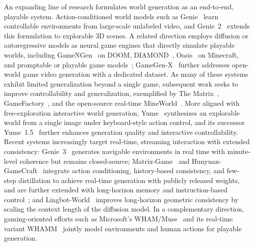 An expanding line of research formulates world generation as an end-to-end, playable system.
Action-conditioned world models such as Genie~\cite{bruce2024genie} learn controllable environments from large-scale unlabeled video, and Genie~2~\cite{parker2024genie} extends this formulation to explorable 3D scenes.
A related direction employs diffusion or autoregressive models as neural game engines that directly simulate playable worlds, including GameNGen~\cite{valevski2025diffusion} on DOOM, DIAMOND~\cite{alonso2024diffusion}, Oasis~\cite{decart2024oasis} on Minecraft, and promptable or playable game models~\cite{menapace2024promptable,yang2024playable}; GameGen-X~\cite{che2025gamegen} further addresses open-world game video generation with a dedicated dataset.
As many of these systems exhibit limited generalization beyond a single game, subsequent work seeks to improve controllability and generalization, exemplified by The Matrix~\cite{feng2026matrix}, GameFactory~\cite{yu2025gamefactory}, and the open-source real-time MineWorld~\cite{guo2025mineworld}.
More aligned with free-exploration interactive world generation, Yume~\cite{mao2025yume} synthesizes an explorable world from a single image under keyboard-style action control, and its successor Yume~1.5~\cite{Mao_2026_CVPR} further enhances generation quality and interactive controllability.
Recent systems increasingly target real-time, streaming interaction with extended consistency: Genie~3~\cite{ball2025genie3} generates navigable environments in real time with minute-level coherence but remains closed-source; Matrix-Game~\cite{he2025matrix} and Hunyuan-GameCraft~\cite{li2025hunyuan} integrate action conditioning, history-based consistency, and few-step distillation to achieve real-time generation with publicly released weights, and are further extended with long-horizon memory and instruction-based control~\cite{wang2026matrix,tang2025hunyuan}; and Lingbot-World~\cite{team2026advancing} improves long-horizon geometric consistency by scaling the context length of the diffusion model.
In a complementary direction, gaming-oriented efforts such as Microsoft's WHAM/Muse~\cite{kanervisto2025world} and its real-time variant WHAMM~\cite{microsoft2025whamm} jointly model environments and human actions for playable generation.